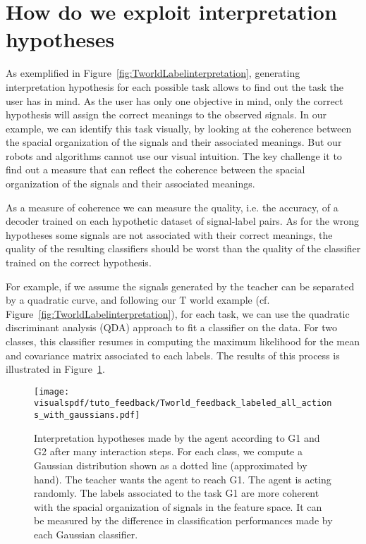 \section{How do we exploit interpretation hypotheses}
\label{chapter:lfui:how}

As exemplified in Figure~\ref{fig:TworldLabelinterpretation}, generating interpretation hypothesis for each possible task allows to find out the task the user has in mind. As the user has only one objective in mind, only the correct hypothesis will assign the correct meanings to the observed signals. In our example, we can identify this task visually, by looking at the coherence between the spacial organization of the signals and their associated meanings. But our robots and algorithms cannot use our visual intuition. The key challenge it to find out a measure that can reflect the coherence between the spacial organization of the signals and their associated meanings.

As a measure of coherence we can measure the quality, i.e. the accuracy, of a decoder trained on each hypothetic dataset of signal-label pairs. As for the wrong hypotheses some signals are not associated with their correct meanings, the quality of the resulting classifiers should be worst than the quality of the classifier trained on the correct hypothesis.

For example, if we assume the signals generated by the teacher can be separated by a quadratic curve, and following our T world example (cf. Figure~\ref{fig:TworldLabelinterpretation}), for each task, we can use the quadratic discriminant analysis (QDA) \cite{lachenbruch1975discriminant} approach to fit a classifier on the data. For two classes, this classifier resumes in computing the maximum likelihood for the mean and covariance matrix associated to each labels. The results of this process is illustrated in Figure~\ref{fig:TworldLabelGaussian}.

\begin{figure}[!htbp]
    \centering
    \texttt{[image: \\visualspdf/tuto\_feedback/Tworld\_feedback\_labeled\_all\_actions\_with\_gaussians.pdf]}
    \caption{Interpretation hypotheses made by the agent according to G1 and G2 after many interaction steps. For each class, we compute a Gaussian distribution shown as a dotted line (approximated by hand). The teacher wants the agent to reach G1. The agent is acting randomly. The labels associated to the task G1 are more coherent with the spacial organization of signals in the feature space. It can be measured by the difference in classification performances made by each Gaussian classifier.}
    \label{fig:TworldLabelGaussian}
\end{figure}

